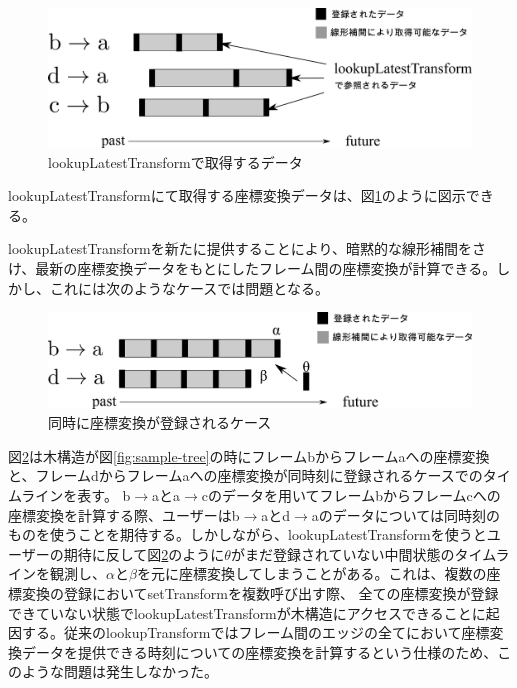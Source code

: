 \documentclass[a4paper]{jreport}	%
\begin{document}
\begin{figure}[h] 
\centering
\includegraphics[width=12cm]{lookupLatestTransform}
\caption{lookupLatestTransformで取得するデータ}
\label{fig:lookupLatestTransform}
\end{figure}

lookupLatestTransformにて取得する座標変換データは、図\ref{fig:lookupLatestTransform}のように図示できる。

lookupLatestTransformを新たに提供することにより、暗黙的な線形補間をさけ、最新の座標変換データをもとにしたフレーム間の座標変換が計算できる。しかし、これには次のようなケースでは問題となる。

\begin{figure}[h] 
\centering
\includegraphics[width=12cm]{coming-same-time}
\caption{同時に座標変換が登録されるケース}
\label{fig:coming-same-time}
\end{figure}


図\ref{fig:coming-same-time}は木構造が図\ref{fig:sample-tree}の時にフレームbからフレームaへの座標変換と、フレームdからフレームaへの座標変換が同時刻に登録されるケースでのタイムラインを表す。
b$\rightarrow$aとa$\rightarrow$cのデータを用いてフレームbからフレームcへの座標変換を計算する際、ユーザーはb$\rightarrow$aとd$\rightarrow$aのデータについては同時刻のものを使うことを期待する。しかしながら、lookupLatestTransformを使うとユーザーの期待に反して図\ref{fig:coming-same-time}のように$\theta$がまだ登録されていない中間状態のタイムラインを観測し、$\alpha$と$\beta$を元に座標変換してしまうことがある。これは、複数の座標変換の登録においてsetTransformを複数呼び出す際、 全ての座標変換が登録できていない状態でlookupLatestTransformが木構造にアクセスできることに起因する。従来のlookupTransformではフレーム間のエッジの全てにおいて座標変換データを提供できる時刻についての座標変換を計算するという仕様のため、このような問題は発生しなかった。
\end{document}
